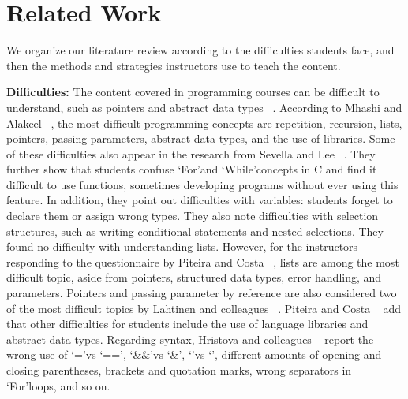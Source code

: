 \documentclass[sigconf]{acmart}
\begin{document}
\section{Related Work}

We organize our literature review according to the difficulties students face, and then the methods and strategies instructors use to teach the content. 

\textbf{Difficulties:} The content covered in programming courses can be difficult to understand, such as pointers and abstract data types ~\cite{Mhashi13,Piteira13}. According to Mhashi and Alakeel ~\cite{Mhashi13}, the most difficult programming concepts are repetition, recursion, lists, pointers, passing parameters, abstract data types, and the use of libraries. Some of these difficulties also appear in the research from Sevella and Lee ~\cite{Sevella13}. They further show that students confuse \textquoteleft For\textquoteright \space and \textquoteleft While\textquoteright \space concepts in C and find it difficult to use functions, sometimes developing programs without ever using this feature. In addition, they point out difficulties with variables: students forget to declare them or assign wrong types. They also note difficulties   with selection structures, such as writing conditional statements and nested selections. They found no difficulty with understanding lists. However, for the instructors responding to the questionnaire by Piteira and Costa ~\cite{Piteira13}, lists are among the most difficult topic, aside from pointers, structured data types, error handling, and parameters. Pointers and passing parameter by reference are also considered two of the most difficult topics by Lahtinen and colleagues ~\cite{Lahtinen05}. Piteira and Costa ~\cite{Piteira13} add that other difficulties for students include the use of language libraries and abstract data types. Regarding syntax, Hristova and colleagues ~\cite{Hristova03} report the wrong use of \textquoteleft =\textquoteright \space vs \textquoteleft==\textquoteright, \textquoteleft\&\&\textquoteright \space vs \textquoteleft\&\textquoteright, \textquoteleft \textbar\textbar\textquoteright \space vs \textquoteleft \textbar\textquoteright, different amounts of opening and closing parentheses, brackets and quotation marks, wrong separators in \textquoteleft For\textquoteright \space loops, and so on. 
\end{document}

